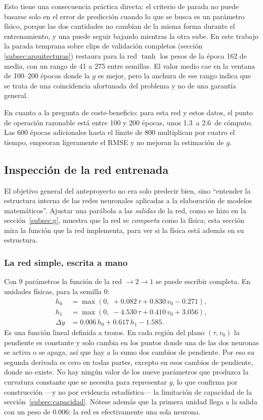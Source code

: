\documentclass[titlepage,11pt]{article}
\providecommand{\SI}[2]{#1\,#2}
\begin{document}
Esto tiene una consecuencia práctica directa: el criterio de parada no puede
basarse solo en el error de predicción cuando lo que se busca es un parámetro
físico, porque las dos cantidades no cambian de la misma forma durante el
entrenamiento, y una puede seguir bajando mientras la otra sube. En este
trabajo
la parada temprana sobre clips de validación completos (sección
\ref{subsec:arquitecturas}) restaura para la red $\tanh$ los pesos de la época
162 de media, con un rango de 41 a 275 entre semillas. El valor medio cae en la
ventana de 100--200 épocas donde la $g$ es mejor, pero la anchura de ese rango
indica que se trata de una coincidencia afortunada del problema y no de una
garantía general.

En cuanto a la pregunta de coste-beneficio: para esta red y estos datos, el
punto de operación razonable está entre 100 y 200 épocas, unos
\SI{1.3}{\second} a \SI{2.6}{\second} de cómputo. Las 600 épocas adicionales
hasta el límite de 800 multiplican por cuatro el tiempo, empeoran ligeramente
el RMSE y no mejoran la estimación de $g$.

\subsection{Inspección de la red entrenada}
\label{subsec:pesos}

El objetivo general del anteproyecto no era solo predecir bien, sino
\enquote{entender la estructura interna de las redes neuronales aplicadas a la
elaboración de modelos matemáticos}. Ajustar una parábola a las
\emph{salidas} de la red, como se hizo en la sección~\ref{subsec:g}, muestra
que la red se \emph{comporta} como la física; esta sección mira la función que
la red implementa, para ver si la física está además en su estructura.

\subsubsection{La red simple, escrita a mano}

Con 9 parámetros la función de la red $\to2\to1$ se puede escribir completa. En
unidades físicas, para la semilla 0:
\begin{align}
  h_0 &= \max(0,\; +0.082\,\tau + 0.830\,v_0 - 0.271), \nonumber\\
  h_1 &= \max(0,\; -4.530\,\tau + 0.410\,v_0 + 3.056), \label{eq:relu_explicita}\\
  \Delta y &= 0.006\,h_0 + 0.617\,h_1 - 1.585. \nonumber
\end{align}
Es una función lineal definida a trozos. En cada región del plano
$(\tau,v_0)$ la pendiente es constante y solo cambia en los puntos donde una
de las dos neuronas se activa o se apaga, así que hay a lo sumo dos cambios de
pendiente. Por eso su segunda derivada es cero en todas partes, excepto en esos
cambios de pendiente, donde no existe. No hay ningún valor de los
nueve parámetros que produzca la curvatura constante que se necesita para
representar $g$, lo que confirma por construcción ---y no por evidencia
estadística--- la limitación de capacidad de la sección~\ref{subsec:capacidad}.
Nótese además que la primera unidad llega a la salida con un peso de $0.006$:
la red es efectivamente una sola neurona.
\end{document}
